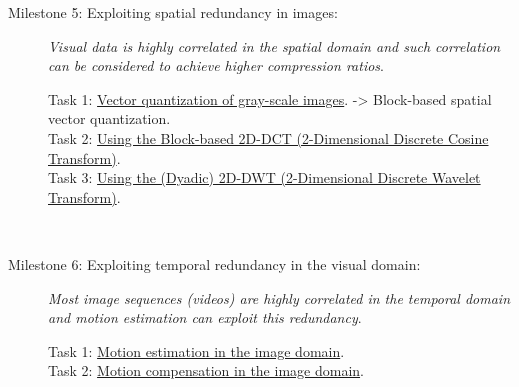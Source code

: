 \begin{description}
\item [Milestone 5: {\normalfont Exploiting spatial redundancy in
    images:}] \emph{Visual data is highly correlated in the spatial
domain and such correlation can be considered to achieve higher
compression ratios}.
  \begin{description}
  \item [Task 1: {\normalfont
      \href{https://sistemas-multimedia.github.io/contents/gray_VQ/}{Vector
        quantization of gray-scale images}. -> Block-based spatial vector quantization.}] %
  \item [Task 2: {\normalfont
      \href{https://sistemas-multimedia.github.io/contents/2D_DCT/}{Using
        the Block-based 2D-DCT (2-Dimensional Discrete Cosine
        Transform)}.}]
  \item [Task 3: {\normalfont
      \href{https://sistemas-multimedia.github.io/contents/DWT/}{Using
        the (Dyadic) 2D-DWT (2-Dimensional Discrete Wavelet
        Transform)}.}]
  \end{description}
  ~\newline

\item [Milestone 6: {\normalfont Exploiting temporal redundancy in
    the visual domain:}] \emph{Most image sequences (videos) are highly
correlated in the temporal domain and motion estimation can exploit
this redundancy}.
  \begin{description}
  \item [Task 1: {\normalfont
      \href{https://sistemas-multimedia.github.io/contents/motion_estimation/}{Motion
        estimation in the image domain}.}]
  \item [Task 2: {\normalfont
      \href{https://sistemas-multimedia.github.io/contents/motion_compensation/}{Motion
        compensation in the image domain}.}]
  \end{description}
  ~\newline


\end{description}
